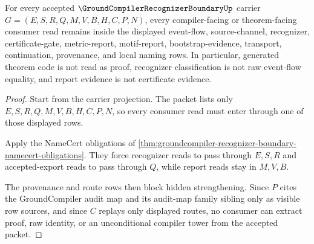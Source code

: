 \begin{theorem}
\label{thm:groundcompiler-recognizer-boundary-nonescape}
For every accepted $\GroundCompilerRecognizerBoundaryUp$ carrier $G=(E,S,R,Q,M,V,B,H,C,P,N)$, every compiler-facing or theorem-facing consumer read remains inside the displayed event-flow, source-channel, recognizer, certificate-gate, metric-report, motif-report, bootstrap-evidence, transport, continuation, provenance, and local naming rows. In particular, generated theorem code is not read as proof, recognizer classification is not raw event-flow equality, and report evidence is not certificate evidence.
\end{theorem}
\begin{proof}
Start from the carrier projection. The packet lists only $E,S,R,Q,M,V,B,H,C,P,N$, so every consumer read must enter through one of those displayed rows.

Apply the NameCert obligations of \autoref{thm:groundcompiler-recognizer-boundary-namecert-obligations}. They force recognizer reads to pass through $E,S,R$ and accepted-export reads to pass through $Q$, while report reads stay in $M,V,B$.

The provenance and route rows then block hidden strengthening. Since $P$ cites the GroundCompiler audit map and its audit-map family sibling only as visible row sources, and since $C$ replays only displayed routes, no consumer can extract proof, raw identity, or an unconditional compiler tower from the accepted packet.
\end{proof}


\begin{closurestatus}{\GroundCompilerRecognizerBoundaryUp}
  \theoryclosure{\seedClosure}
  \formalstatus{\unformalizedV}
\end{closurestatus}
